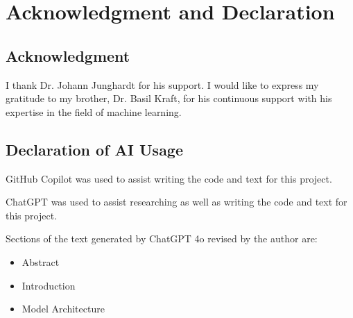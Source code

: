 


\section{Acknowledgment and Declaration}
\label{acknowledgment_declaration}

\subsection{Acknowledgment}%

I thank Dr. Johann Junghardt for his support.
I would like to express my gratitude to my brother, Dr. Basil Kraft, for his continuous
support with his expertise in the field of machine learning. 

\subsection{Declaration of AI Usage}%

GitHub Copilot was used to assist writing the code and text for this project.

ChatGPT was used to assist researching as well as writing the code and text for this project.

Sections of the text generated by ChatGPT 4o revised by the author are:
\begin{itemize}
    \item Abstract
    \item Introduction
    \item Model Architecture
\end{itemize}

\newpage
{}


